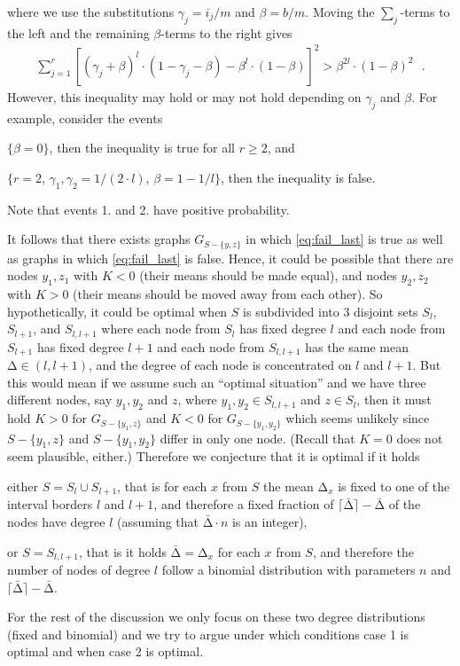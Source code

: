 \let\accentvec\vec \documentclass{llncs}
\newcommand{\keys}{\ensuremath{n}}
\newcommand{\cells}{\ensuremath{m}}
\newcommand{\mean}{{\mathrm{\scriptstyle\Delta}}}
\newcommand{\Amean}{\bar{\mean}}
\newcommand{\ceil}[1]{\ensuremath{\lceil #1\rceil}}
\newcommand{\blank}{\text{ }}
\newcommand{\graph}{\ensuremath{G}}
\newcommand{\low}{\ensuremath{l}}
\newcommand{\bl}{\beta}
\newcommand{\hf}{\gamma}
\begin{document}
where we use the substitutions $\hf_j=i_j/\cells$  and $\bl=b/\cells$. Moving the $\sum_j$-terms to the left and the remaining $\bl$-terms to the right gives
\begin{align*}
 \sum_{j=1}^r \left[ (\hf_j+\bl)^{\low}\cdot (1-\hf_j-\bl) - \bl^\low\cdot(1-\bl)\right]^2 >  \bl^{2\low}\cdot(1-\bl)^2 \blank.
\end{align*}
However, this inequality may hold or may not hold depending on $\hf_j$ and $\bl$. For example, consider
the events 
\begin{compactenum}
 \item $\{\bl=0\}$, then the inequality is true for all $r\geq 2$, and 
 \item $\{r=2$, $\hf_1,\hf_2=1/(2\cdot \low)$, $\bl=1-1/\low\}$, then the inequality is false.
\end{compactenum}
Note that events 1. and 2. have positive probability.

It follows that there exists graphs $\graph_{S-\{y,z\}}$
in which \eqref{eq:fail_last} is true as well as graphs in which \eqref{eq:fail_last} is false.
Hence, it could be possible that there are
nodes $y_1,z_1$ with $K<0$ (their means should be made equal),
and nodes $y_2,z_2$ with $K>0$ (their means should be moved away from each other).
So hypothetically, it could be optimal when 
$S$ is subdivided into 3 disjoint sets $S_{\low}$,$S_{\low+1}$, and $S_{\low,\low+1}$
where each node from $S_{\low}$ has fixed degree $\low$ and each node from $S_{\low+1}$ has fixed degree $\low+1$
and each node from $S_{\low,\low+1}$ has the same mean $\mean\in (\low,\low+1)$, and the degree of each node is concentrated on $\low$ and $\low+1$.
But this would mean if we assume such an ``optimal situation'' and we have three different nodes, say $y_1,y_2$ and $z$, where $y_1,y_2 \in  S_{\low,\low+1}$ and $z\in S_{\low}$,
then it must hold $K>0$ for $\graph_{S-\{y_1,z\}}$ and $K<0$ for $\graph_{S-\{y_1,y_2\}}$ which seems unlikely since $S-\{y_1,z\}$ and $S-\{y_1,y_2\}$ differ in only one node.
(Recall that $K=0$ does not seem plausible, either.) Therefore we conjecture that it is optimal if it holds 
\begin{compactenum}
 \item either    $S=S_{\low} \cup S_{\low+1}$, that is for each $x$ from $S$ the mean $\mean_x$ is fixed to one of the interval borders $\low$ and $\low +1$, and therefore
 a fixed fraction of $\ceil{\Amean}-\Amean$ of the nodes have degree $\low$ (assuming that $\Amean\cdot\keys$ is an integer),
 \item or  $S=S_{\low,\low+1}$, that is it holds $\Amean=\mean_x$ for each $x$ from $S$, and therefore
the number of nodes of degree $\low$ follow a binomial distribution with parameters $n$ and $\ceil{\Amean}-\Amean$.
\end{compactenum}
For the rest of the discussion we only focus on these two degree distributions (fixed and binomial) and 
we try to argue under which conditions case 1 is optimal and when case 2 is optimal.
\end{document}
